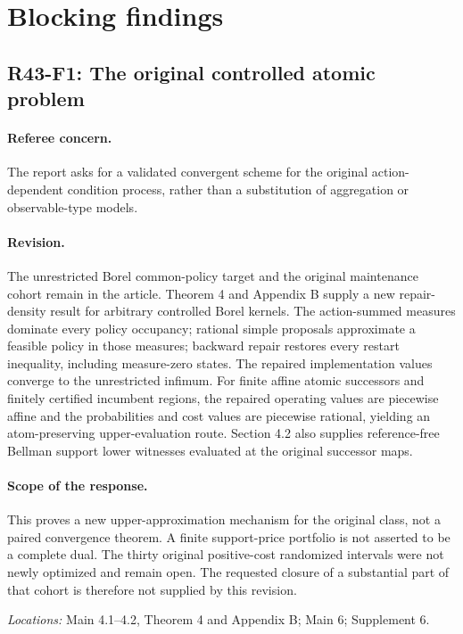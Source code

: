 \section{Blocking findings}
\subsection{R43-F1: The original controlled atomic problem}
\paragraph*{Referee concern.} The report asks for a validated convergent scheme for the original action-dependent condition process, rather than a substitution of aggregation or observable-type models.

\paragraph*{Revision.} The unrestricted Borel common-policy target and the original maintenance cohort remain in the article. Theorem 4 and Appendix B supply a new repair-density result for arbitrary controlled Borel kernels. The action-summed measures dominate every policy occupancy; rational simple proposals approximate a feasible policy in those measures; backward repair restores every restart inequality, including measure-zero states. The repaired implementation values converge to the unrestricted infimum. For finite affine atomic successors and finitely certified incumbent regions, the repaired operating values are piecewise affine and the probabilities and cost values are piecewise rational, yielding an atom-preserving upper-evaluation route. Section 4.2 also supplies reference-free Bellman support lower witnesses evaluated at the original successor maps.

\paragraph*{Scope of the response.} This proves a new upper-approximation mechanism for the original class, not a paired convergence theorem. A finite support-price portfolio is not asserted to be a complete dual. The thirty original positive-cost randomized intervals were not newly optimized and remain open. The requested closure of a substantial part of that cohort is therefore not supplied by this revision.

\noindent\textit{Locations:} Main 4.1--4.2, Theorem 4 and Appendix B; Main 6; Supplement 6.

